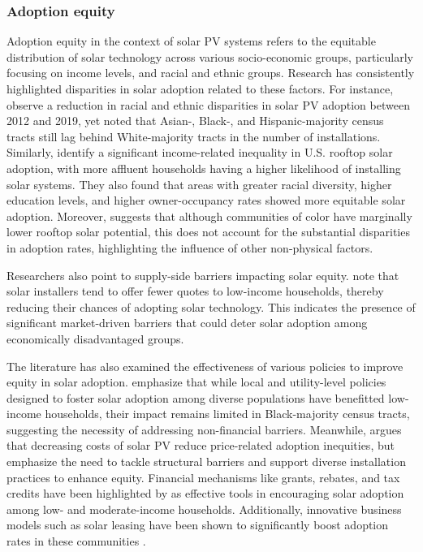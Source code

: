 \documentclass[11pt,twoside,letterpaper]{article}
\begin{document}
 \subsubsection{Adoption equity}

Adoption equity in the context of solar PV systems refers to the equitable distribution of solar technology across various socio-economic groups, particularly focusing on income levels, and racial and ethnic groups. Research has consistently highlighted disparities in solar adoption related to these factors. For instance, \textcite{gao_solar_2022} observe a reduction in racial and ethnic disparities in solar PV adoption between 2012 and 2019, yet noted that Asian-, Black-, and Hispanic-majority census tracts still lag behind White-majority tracts in the number of installations. Similarly, \textcite{darghouth_characterizing_2022} identify a significant income-related inequality in U.S. rooftop solar adoption, with more affluent households having a higher likelihood of installing solar systems. They also found that areas with greater racial diversity, higher education levels, and higher owner-occupancy rates showed more equitable solar adoption. Moreover, \textcite{reames_exploring_2021} suggests that although communities of color have marginally lower rooftop solar potential, this does not account for the substantial disparities in adoption rates, highlighting the influence of other non-physical factors.

Researchers also point to supply-side barriers impacting solar equity. \textcite{oshaughnessy_income-targeted_2021} note that solar installers tend to offer fewer quotes to low-income households, thereby reducing their chances of adopting solar technology. This indicates the presence of significant market-driven barriers that could deter solar adoption among economically disadvantaged groups.

 The literature has also examined the effectiveness of various policies to improve equity in solar adoption. \textcite{gao_solar_2022} emphasize that while local and utility-level policies designed to foster solar adoption among diverse populations have benefitted low-income households, their impact remains limited in Black-majority census tracts, suggesting the necessity of addressing non-financial barriers. Meanwhile, \textcite{darghouth_characterizing_2022} argues that decreasing costs of solar PV reduce price-related adoption inequities, but emphasize the need to tackle structural barriers and support diverse installation practices to enhance equity. Financial mechanisms like grants, rebates, and tax credits have been highlighted by \textcite{oshaughnessy_rooftop_2022} as effective tools in encouraging solar adoption among low- and moderate-income households. Additionally, innovative business models such as solar leasing have been shown to significantly boost adoption rates in these communities \parencite{oshaughnessy_impact_2021}.
\end{document}
